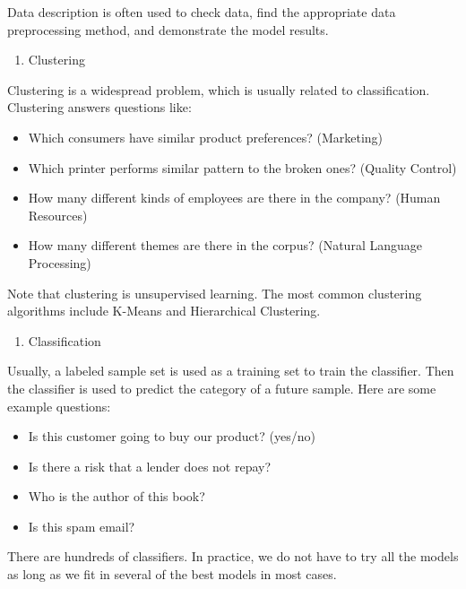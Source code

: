 \documentclass[12pt,]{krantz}
\providecommand{\tightlist}{%
  \setlength{\itemsep}{0pt}\setlength{\parskip}{0pt}}
\theoremstyle{definition}
\theoremstyle{definition}
\theoremstyle{remark}
\begin{document}
Data description is often used to check data, find the appropriate data
preprocessing method, and demonstrate the model results.

\begin{enumerate}
\def\labelenumi{\arabic{enumi}.}
\setcounter{enumi}{2}
\tightlist
\item
  Clustering
\end{enumerate}

Clustering is a widespread problem, which is usually related to
classification. Clustering answers questions like:

\begin{itemize}
\tightlist
\item
  Which consumers have similar product preferences? (Marketing)
\item
  Which printer performs similar pattern to the broken ones? (Quality
  Control)
\item
  How many different kinds of employees are there in the company? (Human
  Resources)
\item
  How many different themes are there in the corpus? (Natural Language
  Processing)
\end{itemize}

Note that clustering is unsupervised learning. The most common
clustering algorithms include K-Means and Hierarchical Clustering.

\begin{enumerate}
\def\labelenumi{\arabic{enumi}.}
\setcounter{enumi}{3}
\tightlist
\item
  Classification
\end{enumerate}

Usually, a labeled sample set is used as a training set to train the
classifier. Then the classifier is used to predict the category of a
future sample. Here are some example questions:

\begin{itemize}
\tightlist
\item
  Is this customer going to buy our product? (yes/no)
\item
  Is there a risk that a lender does not repay?
\item
  Who is the author of this book?
\item
  Is this spam email?
\end{itemize}

There are hundreds of classifiers. In practice, we do not have to try
all the models as long as we fit in several of the best models in most
cases.
\end{document}
